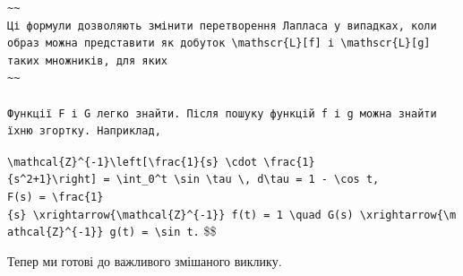 \documentclass[
  ukrainian,
]{article}
\begin{document}
\begin{verbatim}
~~
Ці формули дозволяють змінити перетворення Лапласа у випадках, коли образ можна представити як добуток \mathscr{L}[f] і \mathscr{L}[g] таких множників, для яких
~~

Функції F і G легко знайти. Після пошуку функцій f і g можна знайти їхню згортку. Наприклад,
\end{verbatim}

\texttt{\textbackslash{}mathcal\{Z\}\^{}\{-1\}\textbackslash{}left{[}\textbackslash{}frac\{1\}\{s\}\ \textbackslash{}cdot\ \textbackslash{}frac\{1\}\{s\^{}2+1\}\textbackslash{}right{]}\ =\ \textbackslash{}int\_0\^{}t\ \textbackslash{}sin\ \textbackslash{}tau\ \textbackslash{},\ d\textbackslash{}tau\ =\ 1\ -\ \textbackslash{}cos\ t,}
\texttt{F(s)\ =\ \textbackslash{}frac\{1\}\{s\}\ \textbackslash{}xrightarrow\{\textbackslash{}mathcal\{Z\}\^{}\{-1\}\}\ f(t)\ =\ 1\ \textbackslash{}quad\ G(s)\ \textbackslash{}xrightarrow\{\textbackslash{}mathcal\{Z\}\^{}\{-1\}\}\ g(t)\ =\ \textbackslash{}sin\ t.}
\$\$

Тепер ми готові до важливого змішаного виклику.
\end{document}
